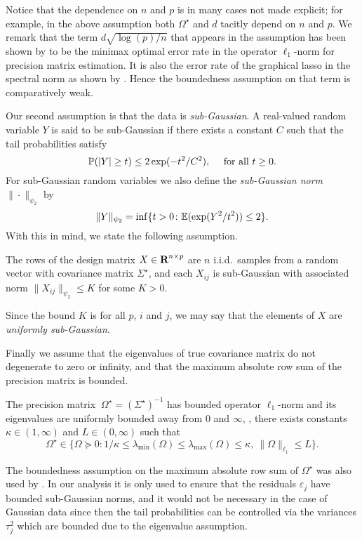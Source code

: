 \documentclass{article}
\begin{document}
Notice that the dependence on $n$ and $p$ is in many cases not made explicit;
for example, in the above assumption both $\Omega^\star$ and $d$ tacitly depend
on $n$ and $p$. We remark that the term $d\sqrt{\log(p)/n}$ that appears in the
assumption has been shown by \cite{Yuan10} to be the minimax optimal error rate
in the operator $\ell_1$-norm for precision matrix estimation. It is also the
error rate of the graphical lasso in the spectral norm as shown by
\cite{Ravikumar11}. Hence the boundedness assumption on that term is
comparatively weak.

Our second assumption is that the data is \emph{sub-Gaussian}. A real-valued
random variable $Y$ is said to be sub-Gaussian if there exists a constant $C$
such that the tail probabilities satisfy 
\[
    {\mathbb{P}}(|Y| \geq t) \leq 2 \exp(-t^2 / C^2), \quad \text{ for all } t \geq 0.
\] 
For sub-Gaussian random variables we also define the \emph{sub-Gaussian norm}
$\|\cdot\|_{\psi_2}$ by
\[
    \|Y\|_{\psi_2} = \inf\{t > 0 \colon {\mathbb{E}}(\exp(Y^2 / t^2)) \leq 2\}.
\]
With this in mind, we state the following assumption.

\begin{assumption}\label{assumption:sub-gaussianity}

The rows of the design matrix $X \in {\mbox{\bf R}}^{n \times p}$ are $n$ i.i.d.\
samples from a random vector with covariance matrix $\Sigma^\star$, and each
$X_{ij}$ is sub-Gaussian with associated norm $\|X_{ij}\|_{\psi_2} \leq K$ for
some $K > 0$. \end{assumption} Since the bound $K$ is for all $p$, $i$ and $j$,
we may say that the elements of $X$ are \textit{uniformly sub-Gaussian}. 

Finally we assume that the eigenvalues of true covariance matrix do not
degenerate to zero or infinity, and that the maximum absolute row sum of the
precision matrix is bounded.

\begin{assumption}\label{assumption:bounded-eigenvalues}    
The precision matrix $\ \Omega^\star = (\Sigma^\star)^{-1}$ has bounded operator
$\ell_1$-norm and its eigenvalues are uniformly bounded away from $0$ and
$\infty$, \ie, there exists constants $\kappa \in (1,\infty)$ and $L \in
(0,\infty)$ such that
\[
    \Omega^\star \in \{\Omega \succeq 0 \colon 1/\kappa \leq \lambda_\mathrm{min}(\Omega) \leq \lambda_\mathrm{max}(\Omega) \leq \kappa, \ \|\Omega\|_{\ell_1} \leq L\}.
\]
\end{assumption}

The boundedness assumption on the maximum absolute row sum of $\Omega^\star$
was also used by \cite{Yuan10}. In our analysis it is only used to ensure that
the residuals $\varepsilon_j$ have bounded sub-Gaussian norms, and it would not
be necessary in the case of Gaussian data since then the tail probabilities can
be controlled via the variances $\tau_j^2$ which are bounded due to the
eigenvalue assumption.
\end{document}
